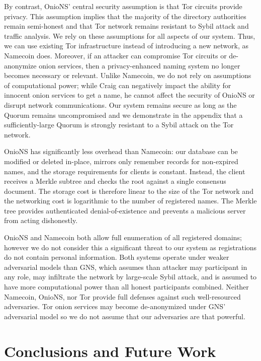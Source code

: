 \documentclass[USenglish,oneside,twocolumn]{article}
\begin{document}
By contrast, OnioNS' central security assumption is that Tor circuits provide privacy. This assumption implies that the majority of the directory authorities remain semi-honest and that Tor network remains resistant to Sybil attack and traffic analysis. We rely on these assumptions for all aspects of our system. Thus, we can use existing Tor infrastructure instead of introducing a new network, as Namecoin does. Moreover, if an attacker can compromise Tor circuits or de-anonymize onion services, then a privacy-enhanced naming system no longer becomes necessary or relevant. Unlike Namecoin, we do not rely on assumptions of computational power; while Craig can negatively impact the ability for innocent onion services to get a name, he cannot affect the security of OnioNS or disrupt network communications. Our system remains secure as long as the Quorum remains uncompromised and we demonstrate in the appendix that a sufficiently-large Quorum is strongly resistant to a Sybil attack on the Tor network.

OnioNS has significantly less overhead than Namecoin: our database can be modified or deleted in-place, mirrors only remember records for non-expired names, and the storage requirements for clients is constant. Instead, the client receives a Merkle subtree and checks the root against a single consensus document. The storage cost is therefore linear to the size of the Tor network and the networking cost is logarithmic to the number of registered names. The Merkle tree provides authenticated denial-of-existence and prevents a malicious server from acting dishonestly.

OnioNS and Namecoin both allow full enumeration of all registered domains; however we do not consider this a significant threat to our system as registrations do not contain personal information. Both systems operate under weaker adversarial models than GNS, which assumes than attacker may participant in any role, may infiltrate the network by large-scale Sybil attack, and is assumed to have more computational power than all honest participants combined. Neither Namecoin, OnioNS, nor Tor provide full defenses against such well-resourced adversaries. Tor onion services may become de-anonymized under GNS' adversarial model so we do not assume that our adversaries are that powerful. %

\section{Conclusions and Future Work}
\end{document}
